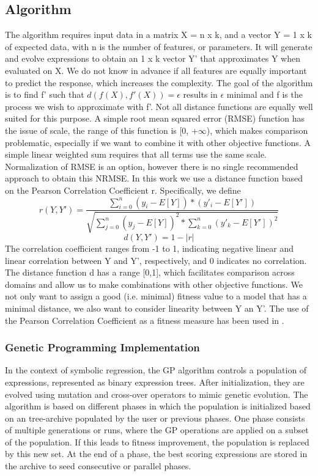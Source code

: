 
\subsection{Algorithm}
The algorithm requires input data in a matrix X = n x k, and a vector Y = 1 x k of expected data, with n is the number of features, or parameters. It will generate and evolve expressions to obtain an 1 x k vector Y' that approximates Y when evaluated on X. We do not know in advance if all features are equally important to predict the response, which increases the complexity.
The goal of the algorithm is to find f' such that
$
d(f(X), f'(X))=\epsilon
$
results in $\epsilon$ minimal and f is the process we wish to approximate with f'.
Not all distance functions are equally well suited for this purpose. A simple root mean squared error (RMSE) function has the issue of scale, the range of this function is [0, +$\infty$), which makes comparison problematic, especially if we want to combine it with other objective functions. A simple linear weighted sum requires that all terms use the same scale.
Normalization of RMSE is an option, however there is no single recommended approach to obtain this NRMSE.
In this work we use a distance function based on the Pearson Correlation Coefficient r. Specifically, we define
\[
r(Y, Y') = \frac{\sum_{i=0}^{n}{(y_i-E[Y])*(y'_i-E[Y'])}}{\sqrt{\sum_{j=0}^{n}{(y_j-E[Y])^2}*\sum_{k=0}^{n}{(y'_k-E[Y'])^2}}}
\]
\[
d(Y, Y') = 1 - 
\lvert r
 \lvert 
 \]
The correlation coefficient ranges from -1 to 1, indicating negative linear and linear correlation between Y and Y', respectively, and 0 indicates no correlation. The distance function d has a range [0,1], which facilitates comparison across domains and allow us to make combinations with other objective functions. We not only want to assign a good (i.e. minimal) fitness value to a model that has a minimal distance, we also want to consider linearity between Y an Y'. The use of the Pearson Correlation Coefficient as a fitness measure has been used in \citep{pearson}.

\subsubsection{Genetic Programming Implementation}
In the context of symbolic regression, the GP algorithm controls a population of expressions, represented as binary expression trees. After initialization, they are evolved using mutation and cross-over operators to mimic genetic evolution.
The algorithm is based on different phases in which the population is initialized based on an tree-archive populated by the user or previous phases. One phase consists of multiple generations or runs, where the GP operations are applied on a subset of the population. If this leads to fitness improvement, the population is replaced by this new set. At the end of a phase, the best scoring expressions are stored in the archive to seed consecutive or parallel phases.

